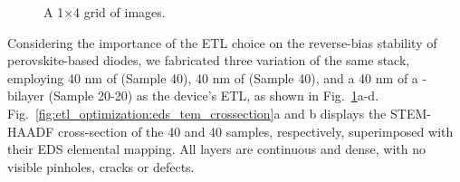 \begin{figure}[htbp]
    \caption{A 1×4 grid of images.}
    \label{fig:etl_optimization:stacks}
\end{figure}

Considering the importance of the ETL choice on the reverse-bias stability of perovskite-based diodes, we fabricated three variation of the same stack, employing 40 nm of  (Sample 40), 40 nm of  (Sample 40), and a 40 nm of a - bilayer (Sample 20-20) as the device's ETL, as shown in Fig.~\ref{fig:etl_optimization:stacks}a-d. Fig.~\ref{fig:etl_optimization:eds_tem_crossection}a and b displays the STEM-HAADF cross-section of the 40 and 40 samples, respectively, superimposed with their EDS elemental mapping. All layers are continuous and dense, with no visible pinholes, cracks or defects. 


